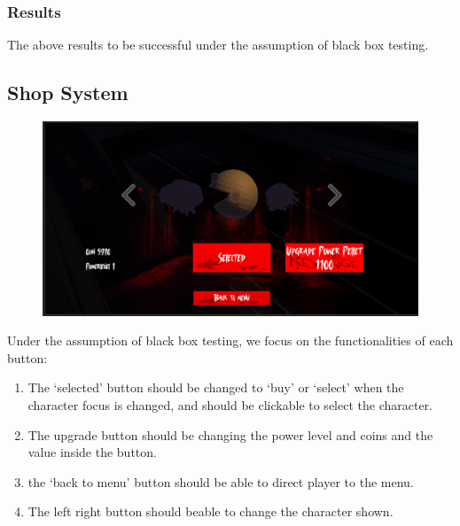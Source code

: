 \documentclass[11pt]{article}
\begin{document}
    \subsubsection*{Results}

    The above results to be successful under the assumption of black box testing.

    \subsection{Shop System}

    \begin{figure}[H]
        \centering
        \includegraphics*[scale=0.4]{Shop.png}
    \end{figure}

    Under the assumption of black box testing, we focus on the functionalities of each button:

    \begin{enumerate}
        \item The `selected' button should be changed to `buy' or `select' when the character focus is changed, and should be clickable to select the character.
        \item The upgrade button should be changing the power level and coins and the value inside the button.
        \item the `back to menu' button should be able to direct player to the menu.
        \item The left right button should beable to change the character shown.
    \end{enumerate}
\end{document}
